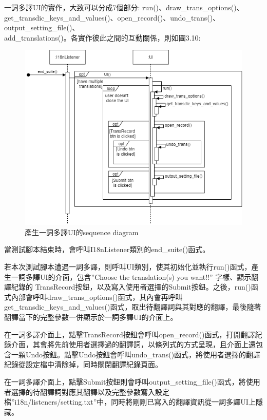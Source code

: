 一詞多譯UI的實作，大致可以分成7個部分: run()、draw\_trans\_options()、get\_transdic\_keys\_and\_values()、open\_record()、undo\_trans()、output\_setting\_file()、\\add\_translations()。各實作彼此之間的互動關係，則如圖3.10:
\begin{figure}[H]
    \centering
    \includegraphics[width= \textwidth]{../UML/i18n sequence diagram-一詞多譯UI.png}
    \caption{產生一詞多譯UI的sequence diagram}
\end{figure}

當測試腳本結束時，會呼叫I18nListener類別的end\_suite()函式。

若本次測試腳本遭遇一詞多譯，則呼叫UI類別，使其初始化並執行run()函式，產生一詞多譯UI的介面，包含”Choose the translation(s) you want!!” 字樣、顯示翻譯紀錄的 TransRecord按鈕，以及寫入使用者選擇的Submit按鈕。之後，run()函式內部會呼叫draw\_trans\_options()函式，其內會再呼叫get\_transdic\_keys\_and\_values()函式，取出待翻譯詞與其對應的翻譯，最後隨著翻譯當下的完整參數一併顯示於一詞多譯UI的介面上。

在一詞多譯介面上，點擊TransRecord按鈕會呼叫open\_record()函式，打開翻譯紀錄介面，其會將先前使用者選擇過的翻譯詞，以條列式的方式呈現，且介面上還包含一顆Undo按鈕。點擊Undo按鈕會呼叫undo\_trans()函式，將使用者選擇的翻譯紀錄從設定檔中清除掉，同時關閉翻譯紀錄頁面。

在一詞多譯介面上，點擊Submit按鈕則會呼叫output\_setting\_file()函式，將使用者選擇的待翻譯詞對應其翻譯以及完整參數寫入設定檔”i18n/listeners/setting.txt”中，同時將剛剛已寫入的翻譯資訊從一詞多譯UI上隱藏。

